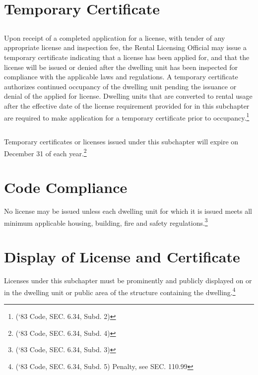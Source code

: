 \section{Temporary Certificate}
\subsection{}
Upon receipt of a completed application for a license, with tender of any appropriate license and inspection fee, the Rental Licensing Official may issue a temporary certificate indicating that a license has been applied for, and that the license will be issued or denied after the dwelling unit has been inspected for compliance with the applicable laws and regulations.  A temporary certificate authorizes continued occupancy of the dwelling unit pending the issuance or denial of the applied for license.  Dwelling units that are converted to rental usage after the effective date of the license requirement provided for in this subchapter are required to make application for a temporary certificate prior to occupancy.\footnote{(‘83 Code, SEC. 6.34, Subd. 2)}
\subsection{}
Temporary certificates or licenses issued under this subchapter will expire on December 31 of each year.\footnote{(‘83 Code, SEC. 6.34, Subd. 4)}

\section{Code Compliance}
No license may be issued unless each dwelling unit for which it is issued meets all minimum applicable housing, building, fire and safety regulations.\footnote{(‘83 Code, SEC. 6.34, Subd. 3)}

\section{Display of License and Certificate}
Licenses under this subchapter must be prominently and publicly displayed on or in the dwelling unit or public area of the structure containing the dwelling.\footnote{(‘83 Code, SEC. 6.34, Subd. 5)  Penalty, see SEC. 110.99}
